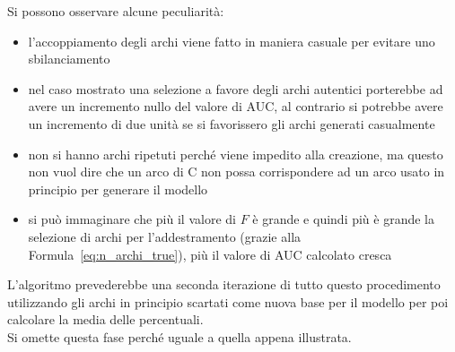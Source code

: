 Si possono osservare alcune peculiarità:
\begin{itemize}
	\item l'accoppiamento degli archi viene fatto in maniera casuale per evitare uno sbilanciamento
	\item nel caso mostrato una selezione a favore degli archi autentici porterebbe ad avere un incremento nullo del valore di AUC, al contrario si potrebbe avere un incremento di due unità se si favorissero  gli archi generati casualmente
	\item non si hanno archi ripetuti perché viene impedito alla creazione, ma questo non vuol dire che un arco di C non possa corrispondere ad un arco usato in principio per generare il modello
	\item si può immaginare che più il valore di $F$ è grande e quindi più è grande la selezione di archi per l'addestramento (grazie alla Formula~\ref{eq:n_archi_true}), più il valore di AUC calcolato cresca
\end{itemize}
L'algoritmo prevederebbe una seconda iterazione di tutto questo procedimento utilizzando gli archi in principio scartati come nuova base per il modello per poi calcolare la media delle percentuali.\\
Si omette questa fase perché uguale a quella appena illustrata.
%
